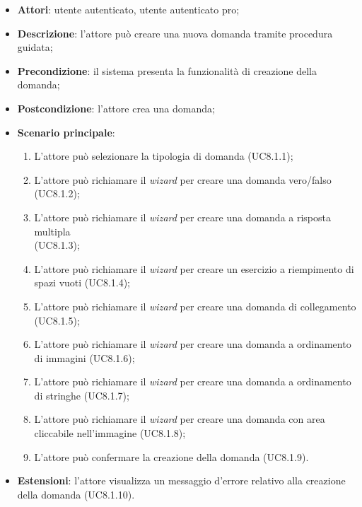 	\begin{itemize}
		\item
			\textbf{Attori}: utente autenticato, utente autenticato pro;
		\item		
			\textbf{Descrizione}: l'attore può creare una nuova domanda tramite procedura guidata;
		\item
			\textbf{Precondizione}: il sistema presenta la funzionalità di creazione della domanda;
		\item
			\textbf{Postcondizione}: l'attore crea una domanda;		
		\item
			\textbf{Scenario principale}:
	       		\begin{enumerate}
					\item
					L'attore può selezionare la tipologia di domanda (UC8.1.1);
					\item
					L'attore può richiamare il \textit{wizard} per creare una domanda vero/falso (UC8.1.2);
					\item
					L'attore può richiamare il \textit{wizard} per creare una domanda a risposta multipla \\(UC8.1.3);
					\item
					L'attore può richiamare il \textit{wizard} per creare un esercizio a riempimento di spazi vuoti (UC8.1.4);
					\item
					L'attore può richiamare il \textit{wizard} per creare una domanda di collegamento (UC8.1.5);
					\item
					L'attore può richiamare il \textit{wizard} per creare una domanda a ordinamento di immagini (UC8.1.6);
					\item
					L'attore può richiamare il \textit{wizard} per creare una domanda a ordinamento di stringhe (UC8.1.7);
					\item
					L'attore può richiamare il \textit{wizard} per creare una domanda con area cliccabile nell'immagine (UC8.1.8);
					\item
					L'attore può confermare la creazione della domanda (UC8.1.9).
	 			\end{enumerate}
	 	\item
			\textbf{Estensioni}: l'attore visualizza un messaggio d'errore relativo alla creazione della domanda (UC8.1.10).
	\end{itemize}

